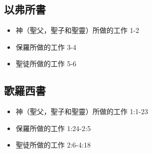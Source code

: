\subsection{以弗所書}
\begin{itemize}%
\itemsep-.25em 
\item 神（聖父，聖子和聖靈）所做的工作 1-2
\item 保羅所做的工作 3-4
\item 聖徒所做的工作 5-6
\end{itemize}

\subsection{歌羅西書}
\begin{itemize}%
\itemsep-.25em 
\item 神（聖父，聖子和聖靈）所做的工作 1:1-23
\item 保羅所做的工作 1:24-2:5
\item 聖徒所做的工作 2:6-4:18
\end{itemize}